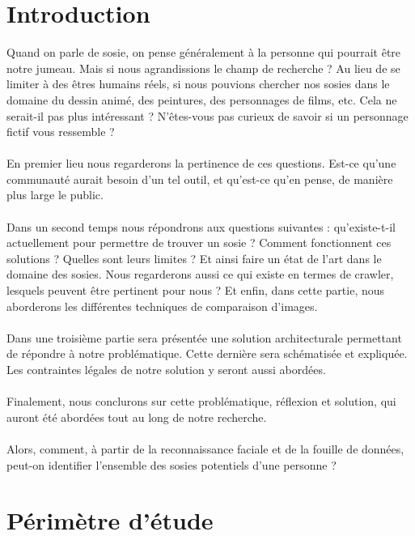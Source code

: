 \documentclass[a4paper,12pt]{article}
\begin{document}
\section*{Introduction}
Quand on parle de sosie, on pense généralement à la personne qui pourrait être notre jumeau. Mais si nous agrandissions le champ de recherche ? Au lieu de se limiter à des êtres humains réels, si nous pouvions chercher nos sosies dans le domaine du dessin animé, des peintures, des personnages de films, etc. Cela ne serait-il pas plus intéressant ? N'êtes-vous pas curieux de savoir si un personnage fictif vous ressemble ? 
\\\\
En premier lieu nous regarderons la pertinence de ces questions. Est-ce qu'une communauté aurait besoin d'un tel outil, et qu'est-ce qu'en pense, de manière plus large le public. 
\\\\
Dans un second temps nous répondrons aux questions suivantes : qu'existe-t-il actuellement pour permettre de trouver un sosie ? Comment fonctionnent ces solutions ? Quelles sont leurs limites ? Et ainsi faire un état de l'art dans le domaine des sosies. Nous regarderons aussi ce qui existe en termes de crawler, lesquels peuvent être pertinent pour nous ? Et enfin, dans cette partie, nous aborderons les différentes techniques de comparaison d'images. 
\\\\
Dans une troisième partie sera présentée une solution architecturale permettant de répondre à notre problématique. Cette dernière sera schématisée et expliquée. Les contraintes légales de notre solution y seront aussi abordées. 
\\\\
Finalement, nous conclurons sur cette problématique, réflexion et solution, qui auront été abordées tout au long de notre recherche. 
\\\\
Alors, comment, à partir de la reconnaissance faciale et de la fouille de données, peut-on identifier l’ensemble des sosies potentiels d’une personne ?


\newpage
\section{Périmètre d'étude}
\end{document}
